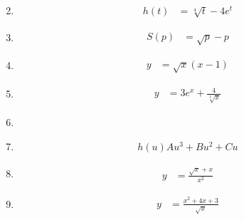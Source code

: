 \documentclass{article}
\begin{document}
\begin{enumerate}
\begin{equation*}
    \end{equation*}
  \item 
    \begin{equation*}
      \begin{split}
        h(t) &= \sqrt[4]{t}-4e^t
      \end{split}
    \end{equation*}
  \item 
    \begin{equation*}
      \begin{split}
        S(p) &= \sqrt{p}-p
      \end{split}
    \end{equation*}
  \item 
    \begin{equation*}
      \begin{split}
        y &= \sqrt{x}(x-1)
      \end{split}
    \end{equation*}
  \item 
    \begin{equation*}
      \begin{split}
        y &= 3e^x+\frac{4}{\sqrt[3]{x}}
      \end{split}
    \end{equation*}
  \item 
  \item 
    \begin{equation*}
      \begin{split}
        h(u)Au^3+Bu^2+Cu
      \end{split}
    \end{equation*}
  \item 
    \begin{equation*}
      \begin{split}
        y &= \frac{\sqrt{x}+x}{x^2}
      \end{split}
    \end{equation*}
  \item 
    \begin{equation*}
      \begin{split}
        y &= \frac{x^2+4x+3}{\sqrt{x}}
      \end{split}

\end{equation*}
\end{enumerate}
\end{document}

